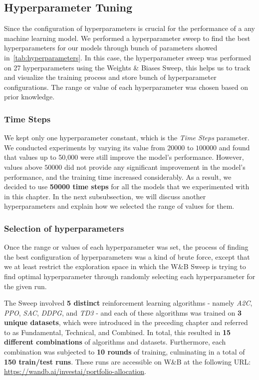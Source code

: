 \documentclass[../xlapes02]{subfiles}
\begin{document}
    \subsection{Hyperparameter Tuning}\label{subsec:hyperparameters_tuning}
    Since the configuration of hyperparameters is crucial for the performance of a any machine learning model. We performed a hyperparameter sweep to find the best hyperparameters for our models through bunch of parameters showed in~\cref{tab:hyperparameters}. In this case, the hyperparameter sweep was performed on 27 hyperparameters using the Weights \& Biases Sweep, this helps us to track and visualize the training process and store bunch of hyperparameter configurations. The range or value of each hyperparameter was chosen based on prior knowledge.

    \subsubsection{Time Steps}\label{subsubsec:time_steps}
    We kept only one hyperparameter constant, which is the \emph{Time Steps} parameter. We conducted experiments by varying its value from $20000$ to $100000$ and found that values up to 50,000 were still improve the model's performance. However, values above $50000$ did not provide any significant improvement in the model's performance, and the training time increased considerably. As a result, we decided to use \textbf{50000 time steps} for all the models that we experimented with in this chapter. In the next subsubsection, we will discuss another hyperparameters and explain how we selected the range of values for them.

    \subsubsection{Selection of hyperparameters}\label{subsubsec:selection_of_hyperparameters}
    Once the range or values of each hyperparameter was set, the process of finding the best configuration of hyperparameters was a kind of brute force, except that we at least restrict the exploration space in which the W\&B Sweep is trying to find optimal hyperparameter through randomly selecting each hyperparameter for the given run.

    The Sweep involved \textbf{5 distinct} reinforcement learning algorithms - namely \emph{A2C}, \emph{PPO}, \emph{SAC}, \emph{DDPG}, and \emph{TD3} - and each of these algorithms was trained on \textbf{3 unique datasets}, which were introduced in the preceding chapter and referred to as Fundamental, Technical, and Combined. In total, this resulted in \textbf{15 different combinations} of algorithms and datasets. Furthermore, each combination was subjected to \textbf{10 rounds} of training, culminating in a total of \textbf{150 train/test runs}. These runs are accessible on W\&B at the following URL: \url{https://wandb.ai/investai/portfolio-allocation}.
\end{document}
